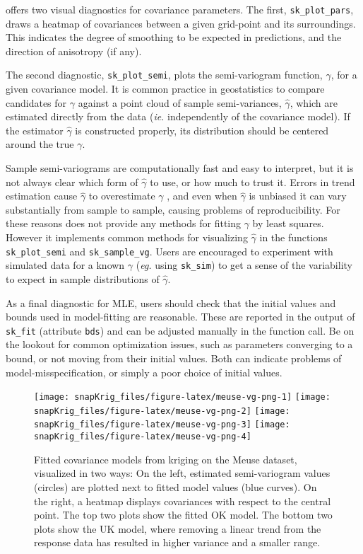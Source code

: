  offers two visual diagnostics for covariance parameters. The first, \texttt{sk\_plot\_pars}, draws a heatmap of covariances between a given grid-point and its surroundings. This indicates the degree of smoothing to be expected in predictions, and the direction of anisotropy (if any).

The second diagnostic, \texttt{sk\_plot\_semi}, plots the semi-variogram function, \({\gamma}\), for a given covariance model. It is common practice in geostatistics to compare candidates for \({\gamma}\) against a point cloud of sample semi-variances, \(\hat{\gamma}\), which are estimated directly from the data (\emph{ie.} independently of the covariance model). If the estimator \(\hat{\gamma}\) is constructed properly, its distribution should be centered around the true \(\gamma\).

Sample semi-variograms are computationally fast and easy to interpret, but it is not always clear which form of \(\hat{\gamma}\) to use, or how much to trust it. Errors in trend estimation cause \(\hat{\gamma}\) to overestimate \(\gamma\) \citep{cressie2015statistics}, and even when \(\hat{\gamma}\) is unbiased it can vary substantially from sample to sample, causing problems of reproducibility. For these reasons  does not provide any methods for fitting \({\gamma}\) by least squares. However it implements common methods for visualizing \(\hat{\gamma}\) in the functions \texttt{sk\_plot\_semi} and \texttt{sk\_sample\_vg}. Users are encouraged to experiment with simulated data for a known \(\gamma\) (\emph{eg.} using \texttt{sk\_sim}) to get a sense of the variability to expect in sample distributions of \(\hat{\gamma}\).

As a final diagnostic for MLE, users should check that the initial values and bounds used in model-fitting are reasonable. These are reported in the output of \texttt{sk\_fit} (attribute \texttt{\textquotesingle{}bds\textquotesingle{}}) and can be adjusted manually in the function call. Be on the lookout for common optimization issues, such as parameters converging to a bound, or not moving from their initial values. Both can indicate problems of model-misspecification, or simply a poor choice of initial values.

\begin{figure}[!htb]
\texttt{[image: snapKrig\_files/figure-latex/meuse-vg-png-1]} \texttt{[image: snapKrig\_files/figure-latex/meuse-vg-png-2]} \texttt{[image: snapKrig\_files/figure-latex/meuse-vg-png-3]} \texttt{[image: snapKrig\_files/figure-latex/meuse-vg-png-4]} \caption{Fitted covariance models from kriging on the Meuse dataset, visualized in two ways: On the left, estimated semi-variogram values (circles) are plotted next to fitted model values (blue curves). On the right, a heatmap displays covariances with respect to the central point. The top two plots show the fitted OK model. The bottom two plots show the UK model, where removing a linear trend from the response data has resulted in higher variance and a smaller range.}\label{fig:meuse-vg-png}
\end{figure}

